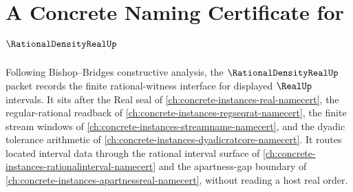 \chapter{A Concrete Naming Certificate for $\RationalDensityRealUp$}
\label{ch:concrete-instances-rational-density-real-namecert}

Following Bishop--Bridges constructive analysis, the $\RationalDensityRealUp$ packet records the finite rational-witness interface for displayed $\RealUp$ intervals. It sits after the Real seal of \autoref{ch:concrete-instances-real-namecert}, the regular-rational readback of \autoref{ch:concrete-instances-regseqrat-namecert}, the finite stream windows of \autoref{ch:concrete-instances-streamname-namecert}, and the dyadic tolerance arithmetic of \autoref{ch:concrete-instances-dyadicratcore-namecert}. It routes located interval data through the rational interval surface of \autoref{ch:concrete-instances-rationalinterval-namecert} and the apartness-gap boundary of \autoref{ch:concrete-instances-apartnessreal-namecert}, without reading a host real order.

